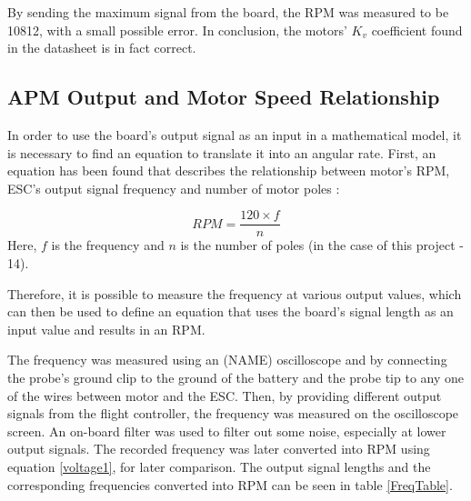 By sending the maximum signal from the board, the RPM was measured to be 10812, with a small possible error.
In conclusion, the motors' $K_v$ coefficient found in the datasheet is in fact correct.

\subsection{APM Output and Motor Speed Relationship}

In order to use the board's output signal as an input in a mathematical model, it is necessary to find an equation to translate it into an angular rate.
First, an equation has been found that describes the relationship between motor's RPM, ESC's output signal frequency and number of motor poles \cite{RPMEq}:

\begin{equation}
\label{voltage1}
	RPM = \frac{120\times f}{n}
\end{equation}
Here, $f$ is the frequency and $n$ is the number of poles (in the case of this project - 14).

Therefore, it is possible to measure the frequency at various output values, which can then be used to define an equation that uses the board's signal length as an input value and results in an RPM.

The frequency was measured using an (NAME) oscilloscope and by connecting the probe's ground clip to the ground of the battery and the probe tip to any one of the wires between motor and the ESC. Then, by providing different output signals from the flight controller, the frequency was measured on the oscilloscope screen. An on-board filter was used to filter out some noise, especially at lower output signals. The recorded frequency was later converted into RPM using equation \ref{voltage1}, for later comparison. The output signal lengths and the corresponding frequencies converted into RPM can be seen in table \ref{FreqTable}.

